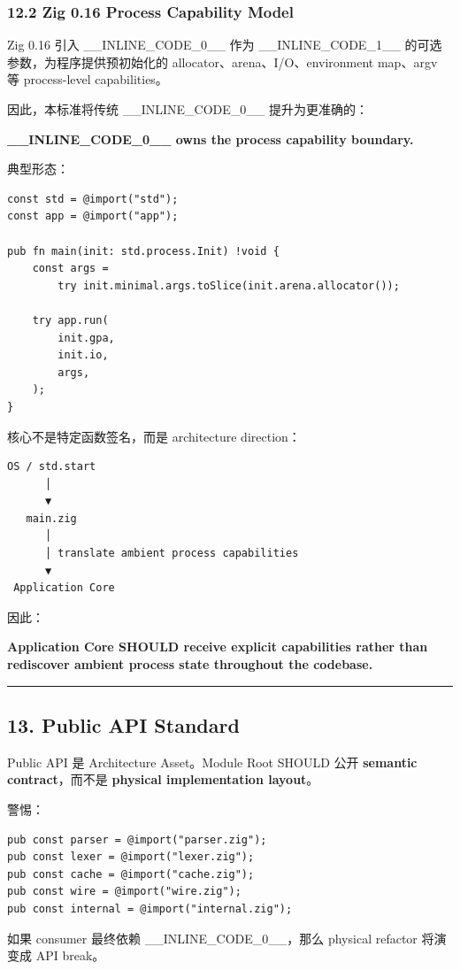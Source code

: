 \documentclass[11pt,a4paper]{article}
\begin{document}
\subsubsection{12.2 Zig 0.16 Process Capability Model}
Zig 0.16 引入 \_\_INLINE\_CODE\_0\_\_ 作为 \_\_INLINE\_CODE\_1\_\_ 的可选参数，为程序提供预初始化的 allocator、arena、I/O、environment map、argv 等 process-level capabilities。

因此，本标准将传统 \_\_INLINE\_CODE\_0\_\_ 提升为更准确的：

\begin{gfmBlockquote}
\textbf{\_\_INLINE\_CODE\_0\_\_ owns the process capability boundary.}
\end{gfmBlockquote}
典型形态：

\begin{lstlisting}[language=zig]
const std = @import("std");
const app = @import("app");

pub fn main(init: std.process.Init) !void {
    const args =
        try init.minimal.args.toSlice(init.arena.allocator());

    try app.run(
        init.gpa,
        init.io,
        args,
    );
}
\end{lstlisting}
核心不是特定函数签名，而是 architecture direction：

\begin{lstlisting}[language=text]
OS / std.start
      │
      ▼
   main.zig
      │
      │ translate ambient process capabilities
      ▼
 Application Core
\end{lstlisting}
因此：

\begin{gfmBlockquote}
\textbf{Application Core SHOULD receive explicit capabilities rather than rediscover ambient process state throughout the codebase.}
\end{gfmBlockquote}
\vspace{0.5em}\hrule\vspace{0.5em}
\subsection{13. Public API Standard}
Public API 是 Architecture Asset。Module Root SHOULD 公开 \textbf{semantic contract}，而不是 \textbf{physical implementation layout}。

警惕：

\begin{lstlisting}[language=zig]
pub const parser = @import("parser.zig");
pub const lexer = @import("lexer.zig");
pub const cache = @import("cache.zig");
pub const wire = @import("wire.zig");
pub const internal = @import("internal.zig");
\end{lstlisting}
如果 consumer 最终依赖 \_\_INLINE\_CODE\_0\_\_，那么 physical refactor 将演变成 API break。
\end{document}
